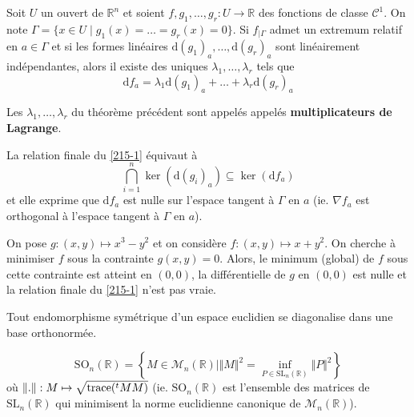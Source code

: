 	\begin{theorem}
		\label{215-1}
		Soit $U$ un ouvert de $\mathbb{R}^n$ et soient $f, g_1, \dots, g_r : U \rightarrow \mathbb{R}$ des fonctions de classe $\mathcal{C}^1$. On note $\Gamma = \{ x \in U \mid g_1(x) = \dots = g_r(x) = 0 \}$. Si $f_{|\Gamma}$ admet un extremum relatif en $a \in \Gamma$ et si les formes linéaires $\mathrm{d}(g_1)_a, \dots, \mathrm{d}(g_r)_a$ sont linéairement indépendantes, alors il existe des uniques $\lambda_1, \dots, \lambda_r$ tels que
		\[ \mathrm{d}f_a = \lambda_1 \mathrm{d}(g_1)_a + \dots + \lambda_r \mathrm{d}(g_r)_a \]
	\end{theorem}

	\begin{definition}
		Les $\lambda_1, \dots, \lambda_r$ du théorème précédent sont appelés appelés \textbf{multiplicateurs de Lagrange}.
	\end{definition}


	\begin{remark}
		La relation finale du \cref{215-1} équivaut à
		\[ \bigcap_{i=1}^n \ker(\mathrm{d}(g_i)_a) \subseteq \ker(\mathrm{d}f_a) \]
		et elle exprime que $\mathrm{d}f_a$ est nulle sur l'espace tangent à $\Gamma$ en $a$ (ie. $\nabla f_a$ est orthogonal à l'espace tangent à $\Gamma$ en $a$).
	\end{remark}

	\begin{cexample}
		On pose $g : (x,y) \mapsto x^3-y^2$ et on considère $f : (x, y) \mapsto x+y^2$. On cherche à minimiser $f$ sous la contrainte $g(x,y) = 0$.
		\newpar
		Alors, le minimum (global) de $f$ sous cette contrainte est atteint en $(0,0)$, la différentielle de $g$ en $(0,0)$ est nulle et la relation finale du \cref{215-1} n'est pas vraie.
	\end{cexample}

	\begin{application}
		Tout endomorphisme symétrique d'un espace euclidien se diagonalise dans une base orthonormée.
	\end{application}


	\begin{application}
		\[ \mathrm{SO}_n(\mathbb{R}) = \left\{ M \in \mathcal{M}_n(\mathbb{R}) \mid \Vert M \Vert^2 = \inf_{P \in \mathrm{SL}_n(\mathbb{R})} \Vert P \Vert^2 \right\} \]
		où $\Vert . \Vert : M \mapsto \sqrt{\operatorname{trace}(\mathstrut ^t MM)}$ (ie. $\mathrm{SO}_n(\mathbb{R})$ est l'ensemble des matrices de $\mathrm{SL}_n(\mathbb{R})$ qui minimisent la norme euclidienne canonique de $\mathcal{M}_n(\mathbb{R})$).
	\end{application}

